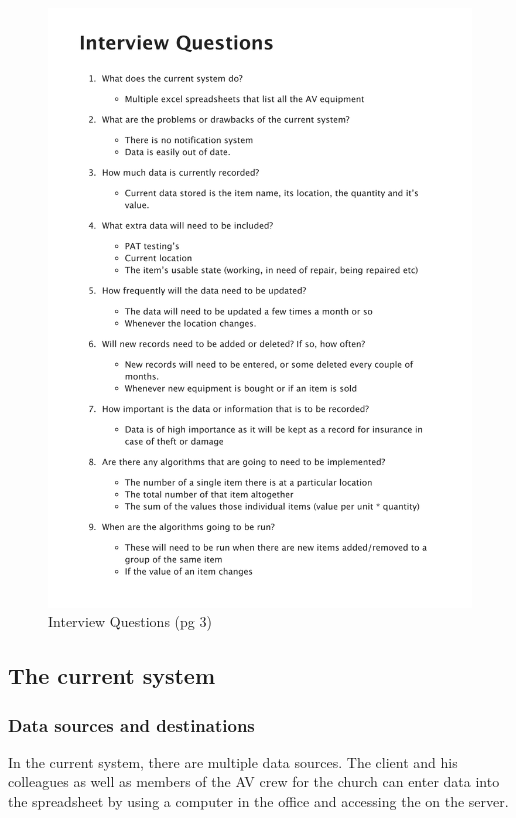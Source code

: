 \begin{figure}[H]		
    \caption{Interview Questions (pg 3)} \label{fig: Interview Questions}
    \includegraphics[page=3,width=\textwidth]{./Analysis/Interview/interview_questions.pdf}
\end{figure}

\subsection{The current system}

\subsubsection{Data sources and destinations}

In the current system, there are multiple data sources. The client and his colleagues as well as members of the AV crew for the church can enter data into the spreadsheet by using a computer in the office and accessing the on the server.

